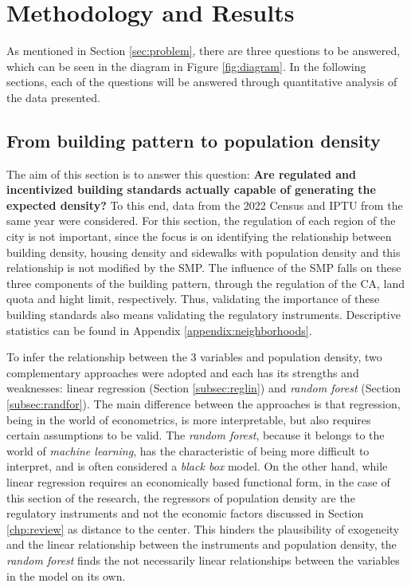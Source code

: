 \chapter{Methodology and Results}
\label{chp:analysis}

As mentioned in Section \ref{sec:problem}, there are three questions to be answered, which can be seen in the diagram in Figure \ref{fig:diagram}. In the following sections, each of the questions will be answered through quantitative analysis of the data presented.


\section{From building pattern to population density}
\label{sec:perg1}


The aim of this section is to answer this question: \textbf{Are regulated and incentivized building standards actually capable of generating the expected density?} To this end, data from the 2022 Census and IPTU from the same year were considered. For this section, the regulation of each region of the city is not important, since the focus is on identifying the relationship between building density, housing density and sidewalks with population density and this relationship is not modified by the SMP. The influence of the SMP falls on these three components of the building pattern, through the regulation of the CA, land quota and hight limit, respectively. Thus, validating the importance of these building standards also means validating the regulatory instruments. Descriptive statistics can be found in Appendix \ref{appendix:neighborhoods}.

To infer the relationship between the 3 variables and population density, two complementary approaches were adopted and each has its strengths and weaknesses: linear regression (Section \ref{subsec:reglin}) and \textit{random forest} (Section \ref{subsec:randfor}). The main difference between the approaches is that regression, being in the world of econometrics, is more interpretable, but also requires certain assumptions to be valid. The \textit{random forest}, because it belongs to the world of \textit{machine learning}, has the characteristic of being more difficult to interpret, and is often considered a \textit{black box} model. On the other hand, while linear regression requires an economically based functional form, in the case of this section of the research, the regressors of population density are the regulatory instruments and not the economic factors discussed in Section \ref{chp:review} as distance to the center. This hinders the plausibility of exogeneity and the linear relationship between the instruments and population density, the \textit{random forest} finds the not necessarily linear relationships between the variables in the model on its own.



